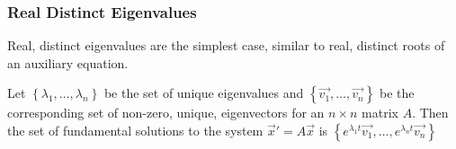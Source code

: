 \subsubsection{Real Distinct Eigenvalues}
\noindent
Real, distinct eigenvalues are the simplest case, similar to real, distinct roots of an auxiliary equation.
\begin{theorem}
	Let $\left\{\lambda_1, \ldots, \lambda_n\right\}$ be the set of unique eigenvalues and $\left\{\vec{v_1}, \ldots, \vec{v_n}\right\}$ be the corresponding set of non-zero, unique, eigenvectors for an $n \times n$ matrix $A$. Then the set of fundamental solutions to the system $\vec{x}' = A\vec{x}$ is $\left\{e^{\lambda_1 t}\vec{v_1}, \ldots, e^{\lambda_n t}\vec{v_n} \right\}$
\end{theorem}

